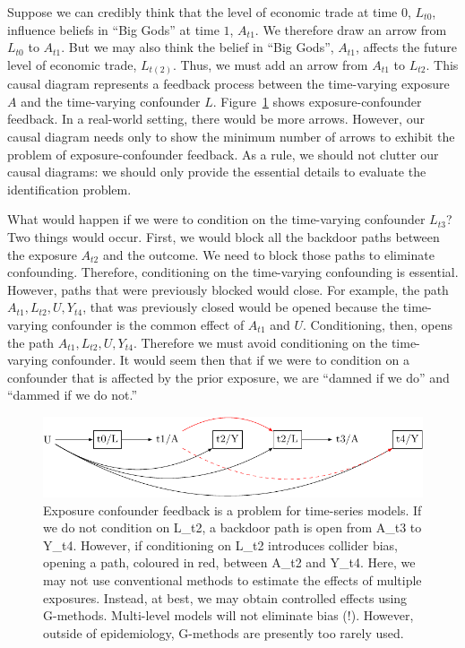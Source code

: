 \documentclass[
  singlecolumn]{article}
\begin{document}
Suppose we can credibly think that the level of economic trade at time
\(0\), \(L_{t0}\), influence beliefs in ``Big Gods'' at time \(1\),
\(A_{t1}\). We therefore draw an arrow from \(L_{t0}\) to \(A_{t1}\).
But we may also think the belief in ``Big Gods'', \(A_{t1}\), affects
the future level of economic trade, \(L_{t(2)}\). Thus, we must add an
arrow from \(A_{t1}\) to \(L_{t2}\). This causal diagram represents a
feedback process between the time-varying exposure \(A\) and the
time-varying confounder \(L\). Figure~\ref{fig-dag-9} shows
exposure-confounder feedback. In a real-world setting, there would be
more arrows. However, our causal diagram needs only to show the minimum
number of arrows to exhibit the problem of exposure-confounder feedback.
As a rule, we should not clutter our causal diagrams: we should only
provide the essential details to evaluate the identification problem.

What would happen if we were to condition on the time-varying confounder
\(L_{t3}\)? Two things would occur. First, we would block all the
backdoor paths between the exposure \(A_{t2}\) and the outcome. We need
to block those paths to eliminate confounding. Therefore, conditioning
on the time-varying confounding is essential. However, paths that were
previously blocked would close. For example, the path
\(A_{t1}, L_{t2}, U, Y_{t4}\), that was previously closed would be
opened because the time-varying confounder is the common effect of
\(A_{t1}\) and \(U\). Conditioning, then, opens the path
\(A_{t1}, L_{t2}, U, Y_{t4}\). Therefore we must avoid conditioning on
the time-varying confounder. It would seem then that if we were to
condition on a confounder that is affected by the prior exposure, we are
``damned if we do'' and ``dammed if we do not.''

\begin{figure}

{\centering \includegraphics[width=1\textwidth,height=\textheight]{causal-dags_files/figure-pdf/fig-dag-9-1.pdf}

}

\caption{\label{fig-dag-9}Exposure confounder feedback is a problem for
time-series models. If we do not condition on L\_t2, a backdoor path is
open from A\_t3 to Y\_t4. However, if conditioning on L\_t2 introduces
collider bias, opening a path, coloured in red, between A\_t2 and Y\_t4.
Here, we may not use conventional methods to estimate the effects of
multiple exposures. Instead, at best, we may obtain controlled effects
using G-methods. Multi-level models will not eliminate bias (!).
However, outside of epidemiology, G-methods are presently too rarely
used.}

\end{figure}
\end{document}
